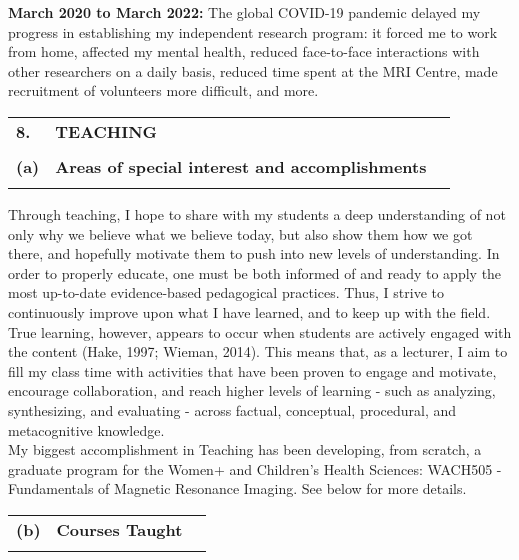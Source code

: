 \documentclass[11pt,notitlepage,english]{report}
\begin{document}
\textbf{March 2020 to March 2022: }The global COVID-19 pandemic delayed my
progress in establishing my independent research program: it forced me to work
from home, affected my mental health, reduced face-to-face interactions with
other researchers on a daily basis, reduced time spent at the MRI Centre, made
recruitment of volunteers more difficult, and more.


\vspace{5pt}
\begin{tabular}{L{.5cm} L{12cm} L{6.9cm}}
  \textbf{8.}  & \textbf{TEACHING}                                      \\
  \\
  \textbf{(a)} & \textbf{Areas of special interest and accomplishments} \\
  \\
\end{tabular}
\label{8. Teaching}

Through teaching, I hope to share with my students a deep understanding of not only why we believe what we believe today, but also show them how we got there, and hopefully motivate them to push into new levels of understanding. In order to properly educate, one must be both informed of and ready to apply the most up-to-date evidence-based pedagogical practices. Thus, I strive to continuously improve upon what I have learned, and to keep up with the field. True learning, however, appears to occur when students are actively engaged with the content (Hake, 1997; Wieman, 2014). This means that, as a lecturer, I aim to fill my class time with activities that have been proven to engage and motivate, encourage collaboration, and reach higher levels of learning - such as analyzing, synthesizing, and evaluating - across factual, conceptual, procedural, and metacognitive knowledge.
\\

My biggest accomplishment in Teaching has been developing, from scratch, a graduate program for the Women+ and Children’s Health Sciences: WACH505 - Fundamentals of Magnetic Resonance Imaging. See below for more details.


\begin{tabular}{L{.5cm} L{8cm} L{6.9cm}}
  \\
  \textbf{(b)} & \textbf{Courses Taught} \\
  \\
\end{tabular}
\end{document}
